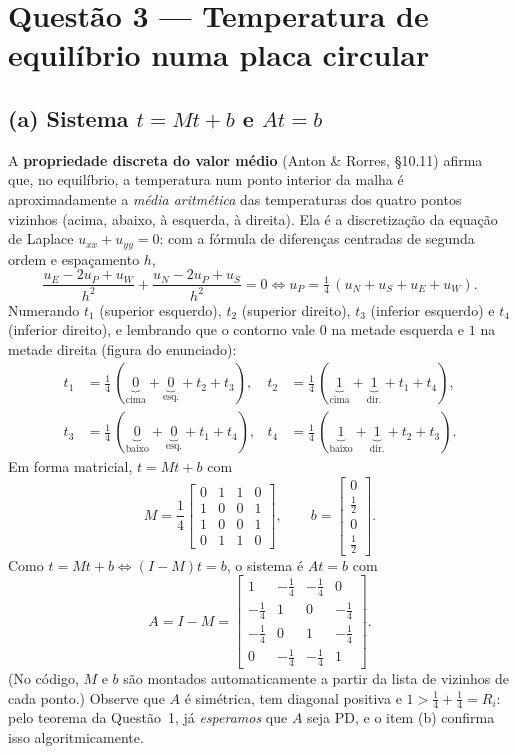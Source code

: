\documentclass{article}
\theoremstyle{remark}
\begin{document}
\section{Questão 3 --- Temperatura de equilíbrio numa placa circular}

\subsection*{(a) Sistema $t=Mt+b$ e $At=b$}
A \textbf{propriedade discreta do valor médio} (Anton \& Rorres, §10.11) afirma que, no equilíbrio, a temperatura num
ponto interior da malha é aproximadamente a \emph{média aritmética} das temperaturas dos quatro pontos vizinhos
(acima, abaixo, à esquerda, à direita). Ela é a discretização da equação de Laplace $u_{xx}+u_{yy}=0$: com a fórmula de
diferenças centradas de segunda ordem e espaçamento $h$,
\[
\frac{u_E-2u_P+u_W}{h^2}+\frac{u_N-2u_P+u_S}{h^2}=0\iff u_P=\tfrac14\,(u_N+u_S+u_E+u_W).
\]
Numerando $t_1$ (superior esquerdo), $t_2$ (superior direito), $t_3$ (inferior esquerdo) e $t_4$ (inferior direito), e
lembrando que o contorno vale $0$ na metade esquerda e $1$ na metade direita (figura do enunciado):
\begin{align*}
t_1&=\tfrac14\,(\underbrace{0}_{\text{cima}}+\underbrace{0}_{\text{esq.}}+t_2+t_3), &
t_2&=\tfrac14\,(\underbrace{1}_{\text{cima}}+\underbrace{1}_{\text{dir.}}+t_1+t_4),\\
t_3&=\tfrac14\,(\underbrace{0}_{\text{baixo}}+\underbrace{0}_{\text{esq.}}+t_1+t_4), &
t_4&=\tfrac14\,(\underbrace{1}_{\text{baixo}}+\underbrace{1}_{\text{dir.}}+t_2+t_3).
\end{align*}
Em forma matricial, $t=Mt+b$ com
\[
M=\frac14\begin{bmatrix}0&1&1&0\\1&0&0&1\\1&0&0&1\\0&1&1&0\end{bmatrix},\qquad
b=\begin{bmatrix}0\\[2pt] \tfrac12\\[2pt] 0\\[2pt] \tfrac12\end{bmatrix}.
\]
Como $t=Mt+b\iff (I-M)t=b$, o sistema é $At=b$ com
\[
A=I-M=\begin{bmatrix}1&-\frac14&-\frac14&0\\[2pt]-\frac14&1&0&-\frac14\\[2pt]-\frac14&0&1&-\frac14\\[2pt]0&-\frac14&-\frac14&1\end{bmatrix}.
\]
(No código, $M$ e $b$ são montados automaticamente a partir da lista de vizinhos de cada ponto.)
Observe que $A$ é simétrica, tem diagonal positiva e $1>\frac14+\frac14=R_i$: pelo teorema da Questão~1, já
\emph{esperamos} que $A$ seja PD, e o item (b) confirma isso algoritmicamente.
\end{document}
